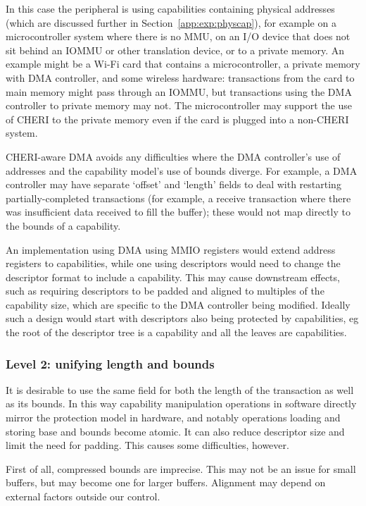 In this case the peripheral is using capabilities containing physical addresses (which are discussed further in Section~\ref{app:exp:physcap}), for example on a microcontroller system where there is no MMU, on an I/O device that does not sit behind an IOMMU or other translation device, or to a private memory.
An example might be a Wi-Fi card that contains a microcontroller, a private memory with DMA controller, and some wireless hardware: transactions from the card to main memory might pass through an IOMMU, but transactions using the DMA controller to private memory may not.
The microcontroller may support the use of CHERI to the private memory even if the card is plugged into a non-CHERI system.

CHERI-aware DMA avoids any difficulties where the DMA controller's use of addresses and the capability model's use of bounds diverge.
For example, a DMA controller may have separate `offset' and `length' fields to deal with restarting partially-completed transactions (for example, a receive transaction where there was insufficient data received to fill the buffer);
these would not map directly to the bounds of a capability.

An implementation using DMA using MMIO registers would extend address registers to capabilities, while one using descriptors would need to change the descriptor format to include a capability.
This may cause downstream effects, such as requiring descriptors to be padded and aligned to multiples of the capability size, which are specific to the DMA controller being modified.
Ideally such a design would start with descriptors also being protected by capabilities, eg the root of the descriptor tree is a capability and all the leaves are capabilities.

\subsubsection{Level 2: unifying length and bounds}
It is desirable to use the same field for both the length of the transaction as well as its bounds.
In this way capability manipulation operations in software directly mirror the protection model in hardware, and notably operations loading and storing base and bounds become atomic.
It can also reduce descriptor size and limit the need for padding.
This causes some difficulties, however.

First of all, compressed bounds are imprecise.
This may not be an issue for small buffers, but may become one for larger buffers.
Alignment may depend on external factors outside our control.

